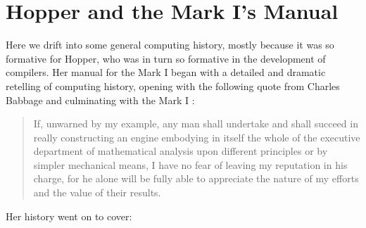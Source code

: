
\section{Hopper and the Mark I's Manual}

Here we drift into some general computing history, mostly because it was so 
formative for Hopper, who was in turn so formative in the development of 
compilers.
Her manual for the Mark I began with a detailed and dramatic retelling of
computing history, opening with the following quote from Charles Babbage and
culminating with the Mark I
\cite{annals_of_the_computation_laboratory_of_harvard_university_1946}:

\begin{quotation}
If, unwarned by my example, any man shall undertake and shall succeed in 
really constructing an engine embodying in itself the whole of the executive 
department of mathematical analysis upon different principles or by simpler 
mechanical means, I have no fear of leaving my reputation in his charge, for he 
alone will be fully able to appreciate the nature of my efforts and the value 
of their results.
\end{quotation}

Her history went on to cover:

